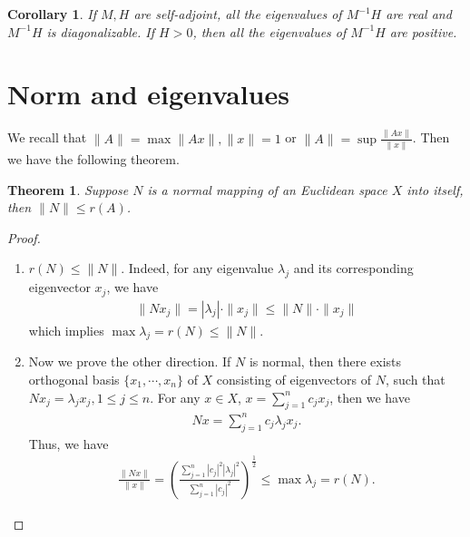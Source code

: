\documentclass[11pt]{book}
\newtheorem{theorem}{Theorem}[section]
\newtheorem{corollary}{Corollary}[section]
\theoremstyle{definition}
\numberwithin{equation}{subsection}
\begin{document}
\medskip

\begin{corollary}
If $M,H$ are self-adjoint, all the eigenvalues of $M^{-1}H$ are real and $M^{-1}H$ is diagonalizable. If $H > 0$, then all the eigenvalues of $M^{-1}H$ are positive.
\end{corollary}

\medskip

\section{Norm and eigenvalues}

We recall that $\|A\| = \max \|Ax\|, \|x\|=1$ or $\|A\| = \sup\frac{\|Ax\|}{\|x\|}$. Then we have the following theorem.

\begin{theorem}
Suppose $N$ is a normal mapping of an Euclidean space $X$ into itself, then $\|N\| \leq r(A)$.
\end{theorem}
\begin{proof}
~\begin{enumerate}[label=(\arabic*)]
    \item $r(N)\leq \|N\|$. Indeed, for any eigenvalue $\lambda_j$ and its corresponding eigenvector $x_j$, we have \begin{align*}
        \|Nx_j\| = |\lambda_j|\cdot \|x_j\|\leq \|N\|\cdot \|x_j\|
    \end{align*}
    which implies $\max \lambda_j = r(N) \leq \|N\|$.
    \item Now we prove the other direction. If $N$ is normal, then there exists orthogonal basis $\{x_1,\cdots, x_n\}$ of $X$ consisting of eigenvectors of $N$, such that $Nx_j = \lambda_j x_j, 1\leq j\leq n$. For any $x\in X$, $x = \sum^n_{j=1}c_j x_j$, then we have
    \begin{align*}
        Nx = \sum^n_{j=1}c_j\lambda_j x_j.
    \end{align*}
    Thus, we have
    \begin{align*}
        \frac{\|Nx\|}{\|x\|} = \left(\frac{\sum^n_{j=1} |c_j|^2 |\lambda_j|^2}{\sum^n_{j=1} |c_j|^2}\right)^{\frac{1}{2}} \leq \max \lambda_j = r(N).
    \end{align*}
\end{enumerate}
\end{proof}

\medskip
\end{document}
